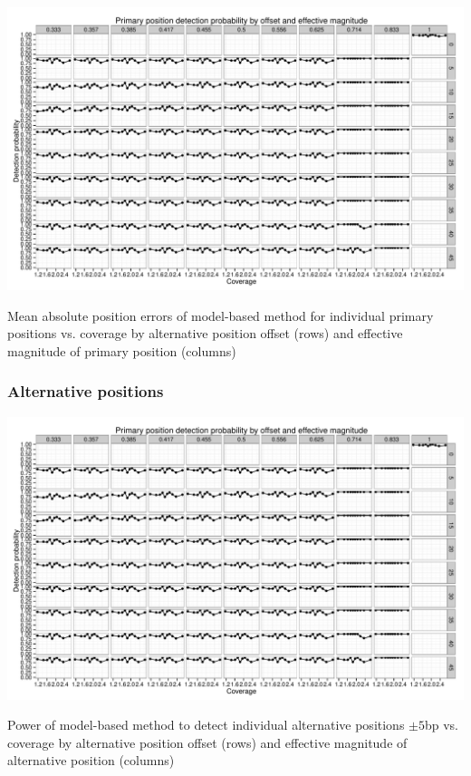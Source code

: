 \begin{FPfigure}
\includegraphics[page=5,width=0.95\textheight,angle=90]{figures/nucleosomes/plots_power_pm3}
\caption{Mean absolute position errors of model-based method for individual primary positions vs. coverage by alternative position offset (rows) and effective magnitude of primary position (columns)}
\end{FPfigure}
\afterpage{\clearpage}
\clearpage


\subsubsection{Alternative positions}

\begin{FPfigure}
\includegraphics[page=9,width=0.95\textheight,angle=90]{figures/nucleosomes/plots_power_pm3}
\caption{Power of model-based method to detect individual alternative positions $\pm 5$bp vs. coverage by alternative position offset (rows) and effective magnitude of alternative position (columns)}
\end{FPfigure}
\afterpage{\clearpage}

